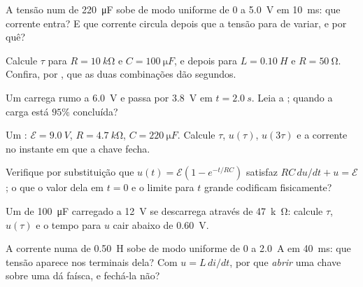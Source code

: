 \begin{exercise}[$\star$]\label{exo:g12:rc-rl-circuits:3}
A tensão num  de \qty{220}{\micro F} sobe de modo uniforme de $0$ a
\qty{5.0}{V} em \qty{10}{ms}: que corrente entra? E que corrente circula depois que a
tensão para de variar, e por quê?
\end{exercise}

\begin{exercise}[$\star$]\label{exo:g12:rc-rl-circuits:4}
Calcule $\tau$ para $R = \qty{10}{k\ohm}$ e $C = \qty{100}{\micro F}$, e depois para
$L = \qty{0.10}{H}$ e $R = \qty{50}{\ohm}$. Confira,  por , que as duas
combinações dão segundos.
\end{exercise}

\begin{exercise}[$\star$]\label{exo:g12:rc-rl-circuits:5}
Um  carrega rumo a \qty{6.0}{V} e passa por \qty{3.8}{V} em
$t = \qty{2.0}{s}$. Leia a ; quando a carga está $95\%$ concluída?
\end{exercise}

\begin{exercise}[$\star\star$]\label{exo:g12:rc-rl-circuits:6}
Um : $\mathcal{E} = \qty{9.0}{V}$, $R = \qty{4.7}{k\ohm}$,
$C = \qty{220}{\micro F}$. Calcule $\tau$, $u(\tau)$, $u(3\tau)$ e a corrente no
instante em que a chave fecha.
\end{exercise}

\begin{exercise}[$\star\star$]\label{exo:g12:rc-rl-circuits:7}
Verifique por substituição que $u(t) = \mathcal{E}(1 - e^{-t/RC})$ satisfaz
$RC\,du/dt + u = \mathcal{E}$; o que o valor dela em $t = 0$ e o limite para $t$ grande
codificam fisicamente?
\end{exercise}

\begin{exercise}[$\star\star$]\label{exo:g12:rc-rl-circuits:8}
Um  de \qty{100}{\micro F} carregado a \qty{12}{V} se descarrega através de
\qty{47}{k\ohm}: calcule $\tau$, $u(\tau)$ e o tempo para $u$ cair abaixo de
\qty{0.60}{V}.
\end{exercise}

\begin{exercise}[$\star\star$]\label{exo:g12:rc-rl-circuits:9}
A corrente numa  de \qty{0.50}{H} sobe de modo uniforme de $0$ a \qty{2.0}{A} em
\qty{40}{ms}: que tensão aparece nos terminais dela? Com $u = L\,di/dt$, por que
\emph{abrir} uma chave sobre uma  dá faísca, e fechá-la não?
\end{exercise}

